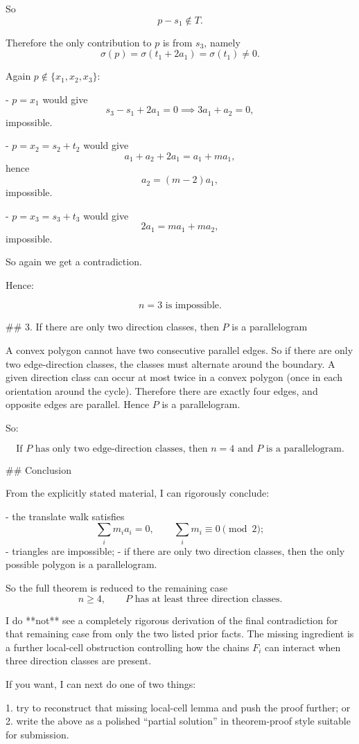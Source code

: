 So
\[
p-s_1\notin T.
\]

Therefore the only contribution to \(p\) is from \(s_3\), namely
\[
\sigma(p)=\sigma(t_1+2a_1)=\sigma(t_1)\neq 0.
\]

Again \(p\notin \{x_1,x_2,x_3\}\):

- \(p=x_1\) would give
  \[
  s_3-s_1+2a_1=0 \implies 3a_1+a_2=0,
  \]
  impossible.

- \(p=x_2=s_2+t_2\) would give
  \[
  a_1+a_2+2a_1=a_1+ma_1,
  \]
  hence
  \[
  a_2=(m-2)a_1,
  \]
  impossible.

- \(p=x_3=s_3+t_3\) would give
  \[
  2a_1=ma_1+ma_2,
  \]
  impossible.

So again we get a contradiction.

Hence:

\[
\boxed{n=3\text{ is impossible}.}
\]

## 3. If there are only two direction classes, then \(P\) is a parallelogram

A convex polygon cannot have two consecutive parallel edges. So if there are only two edge-direction classes, the classes must alternate around the boundary. A given direction class can occur at most twice in a convex polygon (once in each orientation around the cycle). Therefore there are exactly four edges, and opposite edges are parallel. Hence \(P\) is a parallelogram.

So:

\[
\boxed{\text{If }P\text{ has only two edge-direction classes, then }n=4\text{ and }P\text{ is a parallelogram}.}
\]

## Conclusion

From the explicitly stated material, I can rigorously conclude:

- the translate walk satisfies
  \[
  \sum_i m_i a_i=0,\qquad \sum_i m_i\equiv 0\pmod 2;
  \]
- triangles are impossible;
- if there are only two direction classes, then the only possible polygon is a parallelogram.

So the full theorem is reduced to the remaining case
\[
n\ge 4,\qquad P\text{ has at least three direction classes}.
\]

I do **not** see a completely rigorous derivation of the final contradiction for that remaining case from only the two listed prior facts. The missing ingredient is a further local-cell obstruction controlling how the chains \(F_i\) can interact when three direction classes are present.

If you want, I can next do one of two things:

1. try to reconstruct that missing local-cell lemma and push the proof further; or  
2. write the above as a polished “partial solution” in theorem-proof style suitable for submission.